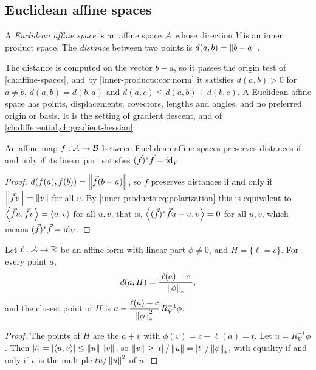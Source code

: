 \begin{notechapter}
\section{Euclidean affine spaces}\label{inner-products:sec:euclidean}

\begin{definition}\label{inner-products:def:euclidean}
A \emph{Euclidean affine space} is an affine space $\mathcal{A}$ whose direction
$V$ is an inner product space. The \emph{distance} between two points is
$d(a, b) = \left\|b - a\right\|$.
\end{definition}

The distance is computed on the vector $b - a$, so it passes the origin
test of \cref{ch:affine-spaces}, and by
\cref{inner-products:cor:norm} it satisfies $d(a, b) > 0$ for $a\neq b$,
$d(a, b) = d(b, a)$ and $d(a, c)\leq d(a, b) + d(b, c)$. A Euclidean affine
space has points, displacements, covectors, lengths and angles, and no
preferred origin or basis. It is the setting of gradient descent, and of
\cref{ch:differential,ch:gradient-hessian}.

\begin{proposition}[Isometries]\label{inner-products:prop:isometry}
An affine map $f:\mathcal{A}\to\mathcal{B}$ between Euclidean affine spaces preserves
distances if and only if its linear part satisfies
$(\vec{f})^{*}\vec{f} = \mathrm{id}_V$.
\end{proposition}

\begin{proof}
$d(f(a), f(b)) = \left\|\vec{f}(b - a)\right\|$, so $f$ preserves distances if and
only if $\left\|\vec{f}v\right\| = \left\|v\right\|$ for all $v$. By
\eqref{inner-products:eq:polarization} this is equivalent to
$\left\langle \vec{f}u, \vec{f}v \right\rangle = \left\langle u, v \right\rangle$ for all $u, v$, that is,
$\left\langle (\vec{f})^{*}\vec{f}u - u, v \right\rangle = 0$ for all $u, v$, which means
$(\vec{f})^{*}\vec{f} = \mathrm{id}_V$.
\end{proof}

\begin{proposition}\label{inner-products:prop:margin}
Let $\ell:\mathcal{A}\to\mathbb{R}$ be an affine form with linear part $\phi\neq0$, and
$H = \{\ell = c\}$. For every point $a$,
\[
  d(a, H) = \frac{\left|\ell(a) - c\right|}{\left\|\phi\right\|_*} ,
\]
and the closest point of $H$ is
$a - \dfrac{\ell(a) - c}{\left\|\phi\right\|_*^2}\,R_V^{-1}\phi$.
\end{proposition}

\begin{proof}
The points of $H$ are the $a + v$ with $\phi(v) = c - \ell(a) = t$. Let
$u = R_V^{-1}\phi$. Then $\left|t\right| = \left|\left\langle u, v \right\rangle\right|\leq\left\|u\right\|\left\|v\right\|$, so
$\left\|v\right\|\geq\left|t\right|/\left\|u\right\| = \left|t\right|/\left\|\phi\right\|_*$, with equality if and only
if $v$ is the multiple $tu/\left\|u\right\|^2$ of $u$.
\end{proof}


\end{notechapter}
